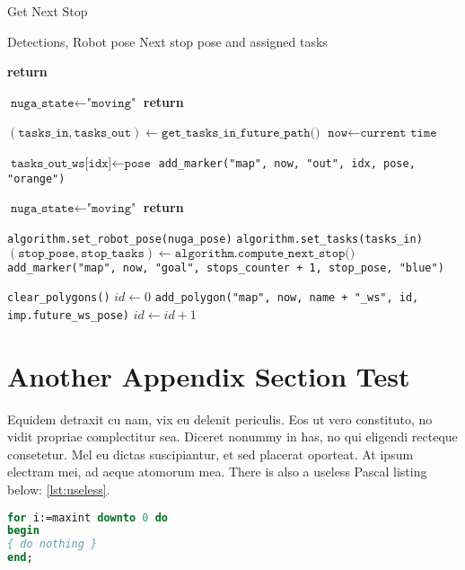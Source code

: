\begin{algorithm}[H]
    \caption{Get Next Stop}
    \label{alg:get-next-stop}
    \begin{algorithmic}[1]
    \REQUIRE Detections, Robot pose
    \ENSURE Next stop pose and assigned tasks

        \STATE \textbf{return}
    \ENDIF

        \STATE $\texttt{nuga\_state} \gets \texttt{"moving"}$
        \STATE \textbf{return}
    \ENDIF

    \STATE $(\texttt{tasks\_in}, \texttt{tasks\_out}) \gets \texttt{get\_tasks\_in\_future\_path()}$
    \STATE $\texttt{now} \gets \texttt{current time}$

            \STATE $\texttt{tasks\_out\_ws[idx]} \gets \texttt{pose}$
            \STATE \texttt{add\_marker("map", now, "out", idx, pose, "orange")}
        \ENDFOR
    \ENDIF

        \STATE $\texttt{nuga\_state} \gets \texttt{"moving"}$
        \STATE \textbf{return}
    \ENDIF

    \STATE \texttt{algorithm.set\_robot\_pose(nuga\_pose)}
    \STATE \texttt{algorithm.set\_tasks(tasks\_in)}
    \STATE $(\texttt{stop\_pose}, \texttt{stop\_tasks}) \gets \texttt{algorithm.compute\_next\_stop()}$
    \STATE \texttt{add\_marker("map", now, "goal", stops\_counter + 1, stop\_pose, "blue")}

    \STATE \texttt{clear\_polygons()}
    \STATE $id \gets 0$
        \STATE \texttt{add\_polygon("map", now, name + "\_ws", id, imp.future\_ws\_pose)}
        \STATE $id \gets id + 1$
    \ENDFOR
    \end{algorithmic}
\end{algorithm}



\section{Another Appendix Section Test}
Equidem detraxit cu nam, vix eu delenit periculis. Eos ut vero
constituto, no vidit propriae complectitur sea. Diceret nonummy in
has, no qui eligendi recteque consetetur. Mel eu dictas suscipiantur,
et sed placerat oporteat. At ipsum electram mei, ad aeque atomorum
mea. There is also a useless Pascal listing below: \autoref{lst:useless}.

\begin{lstlisting}[float=b,language=Pascal,frame=tb,caption={A floating example (\texttt{listings} manual)},label=lst:useless]
for i:=maxint downto 0 do
begin
{ do nothing }
end;
\end{lstlisting}


